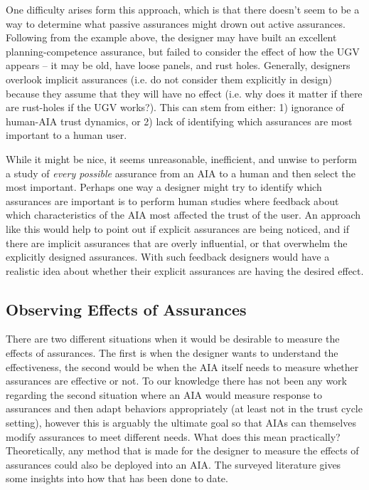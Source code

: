     One difficulty arises form this approach, which is that there doesn't seem to be a way to determine what passive assurances might drown out active assurances. Following from the example above, the designer may have built an excellent planning-competence assurance, but failed to consider the effect of how the UGV appears -- it may be old, have loose panels, and rust holes. Generally, designers overlook implicit assurances (i.e. do not consider them explicitly in design) because they assume that they will have no effect (i.e. why does it matter if there are rust-holes if the UGV works?). This can stem from either: 1) ignorance of human-AIA trust dynamics, or 2) lack of identifying which assurances are most important to a human user.

    While it might be nice, it seems unreasonable, inefficient, and unwise to perform a study of \emph{every possible} assurance from an AIA to a human and then select the most important. Perhaps one way a designer might try to identify which assurances are important is to perform human studies where feedback about which characteristics of the AIA most affected the trust of the user. An approach like this would help to point out if explicit assurances are being noticed, and if there are implicit assurances that are overly influential, or that overwhelm the explicitly designed assurances. With such feedback designers would have a realistic idea about whether their explicit assurances are having the desired effect.

\subsection{Observing Effects of Assurances} \label{sec:measuring_effects}

    There are two different situations when it would be desirable to measure the effects of assurances. The first is when the designer wants to understand the effectiveness, the second would be when the AIA itself needs to measure whether assurances are effective or not. To our knowledge there has not been any work regarding the second situation where an AIA would measure response to assurances and then adapt behaviors appropriately (at least not in the trust cycle setting), however this is arguably the ultimate goal so that AIAs can themselves modify assurances to meet different needs. What does this mean practically? Theoretically, any method that is made for the designer to measure the effects of assurances could also be deployed into an AIA. The surveyed literature gives some insights into how that has been done to date.
   
